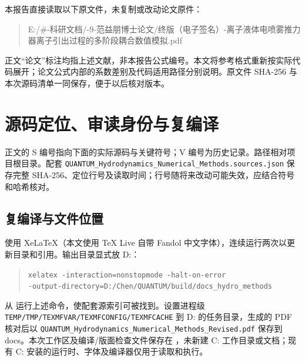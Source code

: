 \documentclass[UTF8,a4paper,11pt,fontset=fandol]{ctexart}
\newcommand{\code}[1]{\nolinkurl{#1}}
\begin{document}
本报告直接读取以下原文件，未复制或改动论文原件：
\begin{quote}\small E:/\#-科研文档/-9-范益朋博士论文/\allowbreak 终版（电子签名）-离子液体电喷雾推力器离子引出过程的多阶段耦合数值模拟.pdf\end{quote}
正文“论文”标注均指上述文献，非本报告公式编号。本文将参考格式重新按实际代码展开；论文公式内部的系数差别及代码适用路径分别说明。原文件 SHA-256 与本次源码清单一同保存，便于以后核对版本。


\section{源码定位、审读身份与复编译}
正文的 S 编号指向下面的实际源码与关键符号；V 编号为历史记录。路径相对项目根目录。配套 \code{QUANTUM_Hydrodynamics_Numerical_Methods.sources.json} 保存完整 SHA-256、定位行号及读取时间；行号随将来改动可能失效，应结合符号和哈希核对。



\subsection*{复编译与文件位置}
使用 XeLaTeX（本文使用 TeX Live 自带 Fandol 中文字体），连续运行两次以更新目录和引用。输出目录显式放 D:：
\begin{quote}\small
\noindent\verb|xelatex -interaction=nonstopmode -halt-on-error|\\
\code{-output-directory=D:/Chen/QUANTUM/build/docs_hydro_methods}\\
\end{quote}
从  运行上述命令，使配套源索引可被找到。设置进程级 \code{TEMP/TMP/TEXMFVAR/TEXMFCONFIG/TEXMFCACHE} 到 D: 的任务目录，生成的 PDF 核对后以 \code{QUANTUM_Hydrodynamics_Numerical_Methods_Revised.pdf} 保存到 docs。本次工作区及编译/版面检查文件保存在 ，未新建 C: 工作目录或文档；现有 C: 安装的运行时、字体及编译器仅用于读取和执行。
\end{document}
